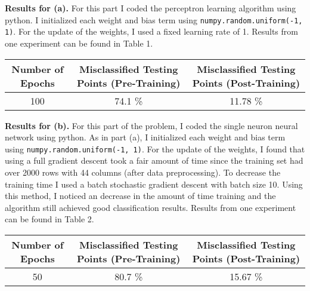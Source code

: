 \documentclass[8pt]{article}
\theoremstyle{definition}
\begin{document}
\noindent \textbf{Results for (a).} For this part I coded the perceptron learning algorithm using python. I initialized each weight and bias term using \texttt{numpy.random.uniform(-1, 1)}. For the update of the weights, I used a fixed learning rate of 1. Results from one experiment can be found in Table 1. \\

\centering
\begin{minipage}{\linewidth}
\label{tab:title}
    \begin{tabular}{ | c | c | c |}
    \hline
    Number of Epochs & Misclassified Testing Points (Pre-Training) & Misclassified Testing Points (Post-Training) \\ \hline
    100 & 74.1 \% & 11.78 \% \\ \hline
    \end{tabular}
\end{minipage}

\justify
\noindent \textbf{Results for (b).} For this part of the problem, I coded the single neuron neural network using python. As in part (a), I initialized each weight and bias term using \texttt{numpy.random.uniform(-1, 1)}. For the update of the weights, I found that using a full gradient descent took a fair amount of time since the training set had over 2000 rows with 44 columns (after data preprocessing). To decrease the training time I used a batch stochastic gradient descent with batch size 10. Using this method, I noticed an decrease in the amount of time training and the algorithm still achieved good classification results. Results from one experiment can be found in Table 2. \\

\centering
\begin{minipage}{\linewidth}
\label{tab:title}
    \begin{tabular}{ | c | c | c |}
    \hline
    Number of Epochs & Misclassified Testing Points (Pre-Training) & Misclassified Testing Points (Post-Training) \\ \hline
    50 & 80.7 \% & 15.67 \% \\ \hline
    \end{tabular}
\end{minipage}


\newpage
\end{document}

